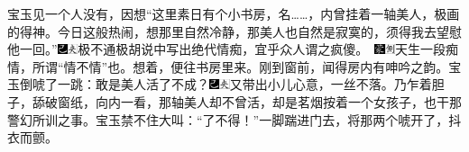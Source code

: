 宝玉见一个人没有，因想“这里素日有个小书房，名\ldots{}\ldots{}，内曾挂着一轴美人，极画的得神。今日这般热闹，想那里自然冷静，那美人也自然是寂寞的，须得我去望慰他一回。”{\includegraphics[width=3mm]{../Images/00003}\includegraphics[width=3mm]{../Images/00012}\footnotesize \kaishu 极不通极胡说中写出绝代情痴，宜乎众人谓之疯傻。　\includegraphics[width=3mm]{../Images/00006}\includegraphics[width=3mm]{../Images/00011}\footnotesize \kaishu 天生一段痴情，所谓“情不情”也。}想着，便往书房里来。刚到窗前，闻得房内有呻吟之韵。宝玉倒唬了一跳：敢是美人活了不成？{\includegraphics[width=3mm]{../Images/00003}\includegraphics[width=3mm]{../Images/00012}\footnotesize \kaishu 又带出小儿心意，一丝不落。}乃乍着胆子，舔破窗纸，向内一看，那轴美人却不曾活，却是茗烟按着一个女孩子，也干那警幻所训之事。宝玉禁不住大叫：“了不得！”一脚踹进门去，将那两个唬开了，抖衣而颤。

